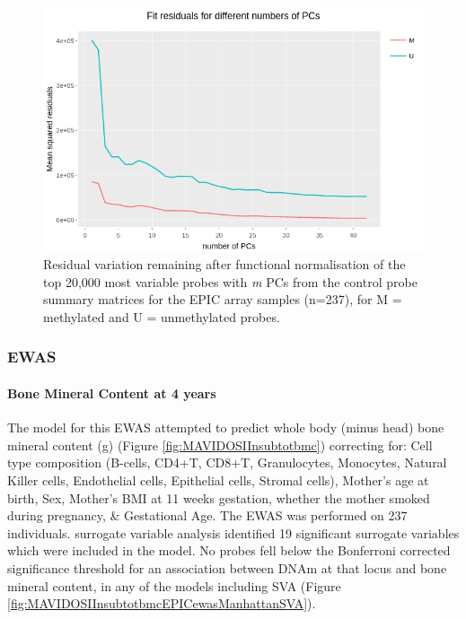 \documentclass[
]{book}
\begin{document}
\begin{figure}

{\centering \includegraphics[width=0.8\linewidth]{figs/MAVIDOS-II-funnormPCsEPIC} 

}

\caption{Residual variation remaining after functional normalisation of the top 20,000 most variable probes with \emph{m} PCs from the control probe summary matrices for the EPIC array samples (n=237), for M = methylated and U = unmethylated probes.}\label{fig:MAVIDOSIIfunnormPCsEPIC}
\end{figure}



\hypertarget{ewas}{%
\subsubsection{EWAS}\label{ewas}}

\hypertarget{bone-mineral-content-at-4-years}{%
\paragraph{Bone Mineral Content at 4 years}\label{bone-mineral-content-at-4-years}}

The model for this EWAS attempted to predict whole body (minus head) bone mineral content (g) (Figure \ref{fig:MAVIDOSIInsubtotbmc}) correcting for: Cell type composition (B-cells, CD4+T, CD8+T, Granulocytes, Monocytes, Natural Killer cells, Endothelial cells, Epithelial cells, Stromal cells), Mother's age at birth, Sex, Mother's BMI at 11 weeks gestation, whether the mother smoked during pregnancy, \& Gestational Age.
The EWAS was performed on 237 individuals.
surrogate variable analysis identified 19 significant surrogate variables which were included in the model.
No probes fell below the Bonferroni corrected significance threshold for an association between DNAm at that locus and bone mineral content, in any of the models including SVA (Figure \ref{fig:MAVIDOSIInsubtotbmcEPICewasManhattanSVA}).
\end{document}
